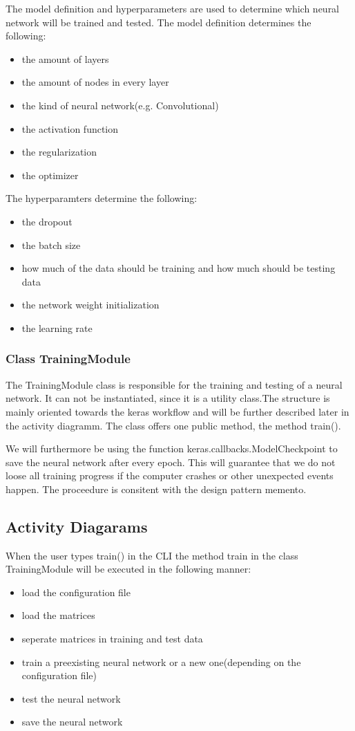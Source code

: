 \documentclass[parskip=full]{scrartcl}
\begin{document}
The model definition and hyperparameters are used to determine which neural network will be trained and tested. The model definition determines the following:
\begin{itemize}
\item the amount of layers
\item the amount of nodes in every layer
\item the kind of neural network(e.g. Convolutional)
\item the activation function
\item the regularization
\item the optimizer
\end{itemize}

The hyperparamters determine the following:

\begin{itemize}
\item the dropout
\item the batch size
\item how much of the data should be training and how much should be testing data
\item the network weight initialization
\item the learning rate
\end{itemize}

\subsubsection{Class TrainingModule}
The TrainingModule class is responsible for the training and testing of a neural network.
It can not be instantiated, since it is a utility class.The structure is mainly oriented towards the keras workflow and will be further described later in the activity diagramm.
The class offers one public method, the method train(). \newline

We will furthermore be using the function keras.callbacks.ModelCheckpoint to save the neural network after every epoch. This will guarantee that we do not loose all training progress if the computer crashes or other unexpected events happen. The proceedure is consitent with the design pattern \gls{memento}. 


\subsection{Activity Diagarams}
When the user types train() in the CLI the method train in the class TrainingModule will be executed in the following manner:

\begin{itemize}
\item load the configuration file
\item load the matrices
\item seperate matrices in training and test data
\item train a preexisting neural network or a new one(depending on the configuration file)
\item test the neural network
\item save the neural network
\end{itemize}
\end{document}
